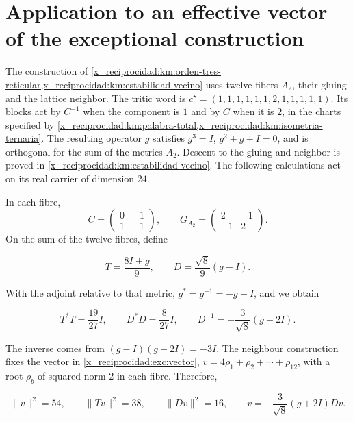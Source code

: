 \section{Application to an effective vector of the exceptional construction}

The construction of
\cref{x_reciprocidad:km:orden-tres-reticular,x_reciprocidad:km:estabilidad-vecino}
uses twelve fibers \(A_2\), their gluing and the lattice neighbor.
The tritic word is
\(c^\star=(1,1,1,1,1,1,2,1,1,1,1,1)\).
Its blocks act by \(C^{-1}\) when the component is \(1\)
and by \(C\) when it is \(2\), in the charts specified by
\cref{x_reciprocidad:km:palabra-total,x_reciprocidad:km:isometria-ternaria}.
The resulting operator \(g\) satisfies
\(g^3=I\), \(g^2+g+I=0\), and is orthogonal for the sum of the
metrics \(A_2\).
Descent to the gluing and neighbor is proved in
\cref{x_reciprocidad:km:estabilidad-vecino}.
The following calculations act on its real carrier of
dimension \(24\).

In each fibre,
\[
 C=\begin{pmatrix}0&-1\\1&-1\end{pmatrix},
 \qquad
 G_{A_2}=\begin{pmatrix}2&-1\\-1&2\end{pmatrix}.
\]
On the sum of the twelve fibres, define



\[
T=\frac{8I+g}{9},\qquad D=\frac{\sqrt8}{9}(g-I).
\]



With the adjoint relative to that metric, \(g^*=g^{-1}=-g-I\), and we obtain



\begin{equation}
T^*T=\frac{19}{27}I,
\qquad D^*D=\frac8{27}I,
\qquad D^{-1}=-\frac3{\sqrt8}(g+2I).
\label{x_reciprocidad:nuc11:eq:18}
\end{equation}



The inverse comes from \((g-I)(g+2I)=-3I\). The neighbour construction fixes the vector in \eqref{x_reciprocidad:exc:vector}, \(v=4\rho_1+\rho_2+\cdots+\rho_{12}\), with a root \(\rho_b\) of squared norm \(2\) in each fibre. Therefore,



\begin{equation}
\|v\|^2=54,\qquad \|Tv\|^2=38,\qquad \|Dv\|^2=16,
\qquad v=-\frac3{\sqrt8}(g+2I)Dv.
\label{x_reciprocidad:nuc11:eq:19}
\end{equation}



